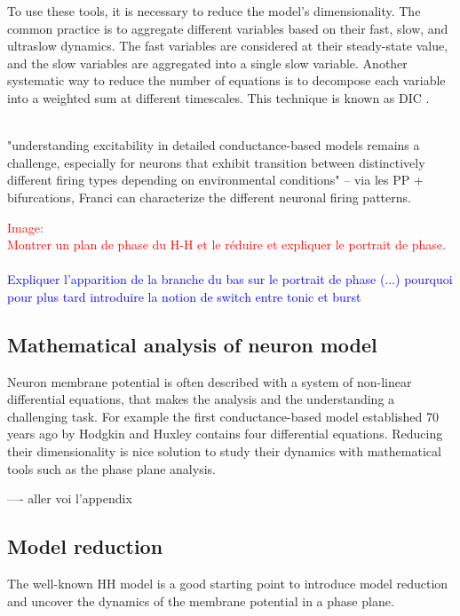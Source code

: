To use these tools, it is necessary to reduce the model's dimensionality. The common practice is to aggregate different variables based on their fast, slow, and ultraslow dynamics. The fast variables are considered at their steady-state value, and the slow variables are aggregated into a single slow variable. Another systematic way to reduce the number of equations is to decompose each variable into a weighted sum at different timescales. This technique is known as \acrfull{DIC} \citep{drion_dynamic_2015}.

~\\
\citep{franci_organizing_2012,franci_balance_2013} "understanding excitability in detailed conductance-based models remains a challenge, especially for neurons that exhibit transition between distinctively different firing types depending on environmental conditions" -- via les PP + bifurcations, Franci can characterize the different neuronal firing patterns. 

\begin{pinkshaded}
\textcolor{red}{Image: \\
Montrer un plan de phase du H-H et le réduire et expliquer le portrait de phase. }
~\\
\textcolor{blue}{Expliquer l'apparition de la branche du bas sur le portrait de phase (...) pourquoi pour plus tard introduire la notion de switch entre tonic et burst}
\end{pinkshaded}




\subsection{Mathematical analysis of neuron model}
Neuron membrane potential is often described with a system of non-linear differential equations, that makes the analysis and the understanding a challenging task. For example the first conductance-based model established 70 years ago by Hodgkin and Huxley contains four differential equations.  Reducing their dimensionality is nice solution to study their dynamics with mathematical tools such as the phase plane analysis. 


\color{gray}
---- aller voi l'appendix


\subsection{Model reduction}
The well-known \acrshort{HH} model is a good starting point to introduce model reduction and uncover the dynamics of the membrane potential in a phase plane. 

